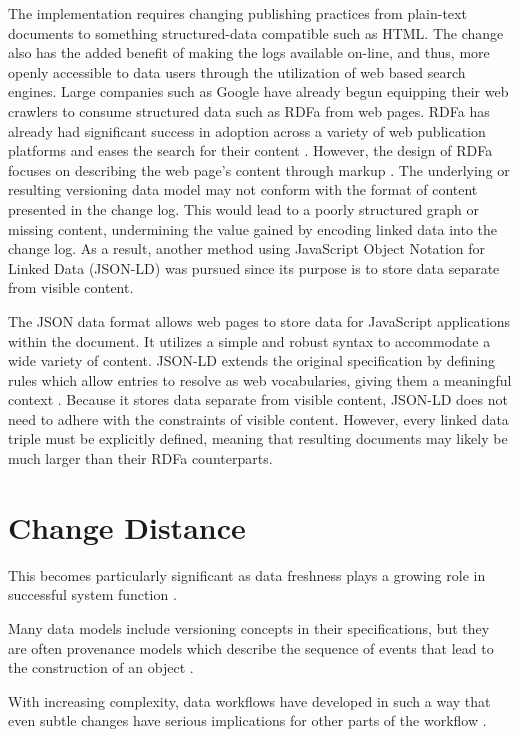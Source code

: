 The implementation requires changing publishing practices from plain-text documents to something structured-data compatible such as HTML.
The change also has the added benefit of making the logs available on-line, and thus, more openly accessible to data users through the utilization of web based search engines.
Large companies such as Google have already begun equipping their web crawlers to consume structured data such as RDFa from web pages.
RDFa has already had significant success in adoption across a variety of web publication platforms and eases the search for their content \cite{Bizer2013}.
However, the design of RDFa focuses on describing the web page's content through markup \cite{Herman2015}.
The underlying or resulting versioning data model may not conform with the format of content presented in the change log.
This would lead to a poorly structured graph or missing content, undermining the value gained by encoding linked data into the change log.
As a result, another method using JavaScript Object Notation for Linked Data (JSON-LD) was pursued since its purpose is to store data separate from visible content.

The JSON data format allows web pages to store data for JavaScript applications within the document.
It utilizes a simple and robust syntax to accommodate a wide variety of content.
JSON-LD extends the original specification by defining rules which allow entries to resolve as web vocabularies, giving them a meaningful context \cite{JSONLD}.
Because it stores data separate from visible content, JSON-LD does not need to adhere with the constraints of visible content.
However, every linked data triple must be explicitly defined, meaning that resulting documents may likely be much larger than their RDFa counterparts.

\section{Change Distance}

This becomes particularly significant as data freshness plays a growing role in successful system function \cite{Bouzeghoub:2004:FAD:1012453.1012464}.

Many data models include versioning concepts in their specifications, but they are often provenance models which describe the sequence of events that lead to the construction of an object \cite{dai2014provenance}.

With increasing complexity, data workflows have developed in such a way that even subtle changes have serious implications for other parts of the workflow \cite{TILMES2011548}.

